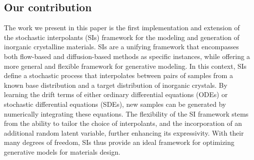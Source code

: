 



\subsection{Our contribution}

The work we present in this paper is the first implementation and extension of the stochastic interpolants (SIs) framework \citep{albergo_stochastic_2023} for the modeling and generation of inorganic crystalline materials. SIs are a unifying framework that encompasses both flow-based and diffusion-based methods as specific instances, while offering a more general and flexible framework for generative modeling. In this context, SIs define a stochastic process that interpolates between pairs of samples from a known base distribution and a target distribution of inorganic crystals. By learning the drift terms of either ordinary differential equations (ODEs) or stochastic differential equations (SDEs), new samples can be generated by numerically integrating these equations. The flexibility of the SI framework stems from the ability to tailor the choice of interpolants, and the incorporation of an additional random latent variable, further enhancing its expressivity. With their many degrees of freedom, SIs thus provide an ideal framework for optimizing generative models for materials design.



